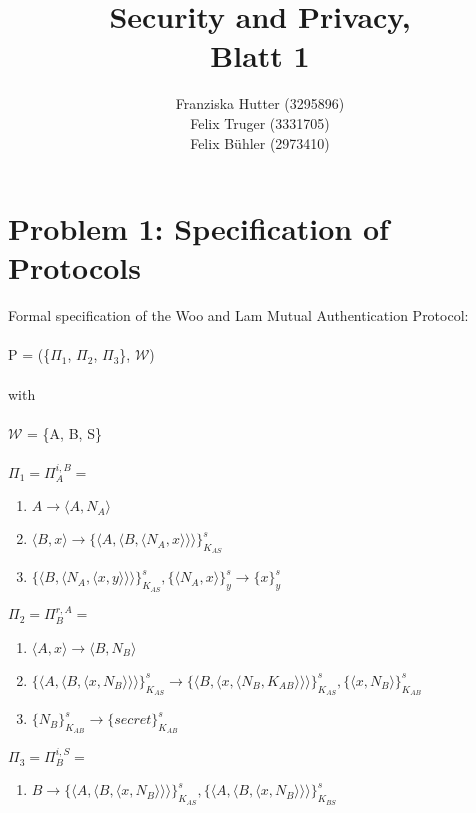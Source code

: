 \documentclass[12pt,pdftex,a4paper]{article}
\title{Security and Privacy,\\ Blatt 1}
\author{Franziska Hutter (3295896)\\
	Felix Truger (3331705)\\
	Felix Bühler (2973410)}
\newcommand\tab[1][1cm]{\hspace*{#1}}
\begin{document}
\maketitle
\pagebreak

\section*{Problem 1: Specification of Protocols}
Formal specification of the Woo and Lam Mutual Authentication Protocol:
\\~\\
P = (\{$\Pi_1$, $\Pi_2$, $\Pi_3$\}, $\mathcal{W}$)\\~\\
with\\~\\
$\mathcal{W}$ = \{A, B, S\}\\~\\

$\Pi_1 = \Pi_A^{i,B} =$
\begin{enumerate}
	\item \tab $ A \rightarrow \langle A, N_A\rangle $
	\item \tab $ \langle B, x \rangle \rightarrow \{\langle A, \langle B, \langle N_A, x\rangle\rangle\rangle\}_{K_{AS}}^s$	
	\item \tab $ \{\langle B,\langle N_A, \langle x, y\rangle\rangle\rangle\}_{K_{AS}}^{s}, \{\langle N_A, x\rangle\}_y^s \rightarrow \{x\}_y^s $
\end{enumerate} 

$\Pi_2 = \Pi_B^{r,A} =$
\begin{enumerate}
\item \tab $\langle A, x\rangle \rightarrow \langle B, N_B \rangle$
\item \tab $\{\langle A, \langle B, \langle x, N_B \rangle\rangle\rangle\}_{K_{AS}}^s
\rightarrow \{\langle B,\langle x, \langle N_B, K_{AB}\rangle\rangle\rangle\}_{K_{AS}}^{s}, \{\langle x, N_B\rangle\}_{K_{AB}}^s$
\item \tab $ \{N_B\}_{K_{AB}}^s \rightarrow \{secret\}_{K_{AB}}^s$
\end{enumerate}

$\Pi_3 = \Pi_B^{i,S} =$
\begin{enumerate}
\item \tab $ B \rightarrow \{\langle A, \langle B, \langle x, N_B \rangle\rangle\rangle\}_{K_{AS}}^s, \{\langle A, \langle B, \langle x, N_B \rangle\rangle\rangle\}_{K_{BS}}^s $
\end{enumerate}
\end{document}
